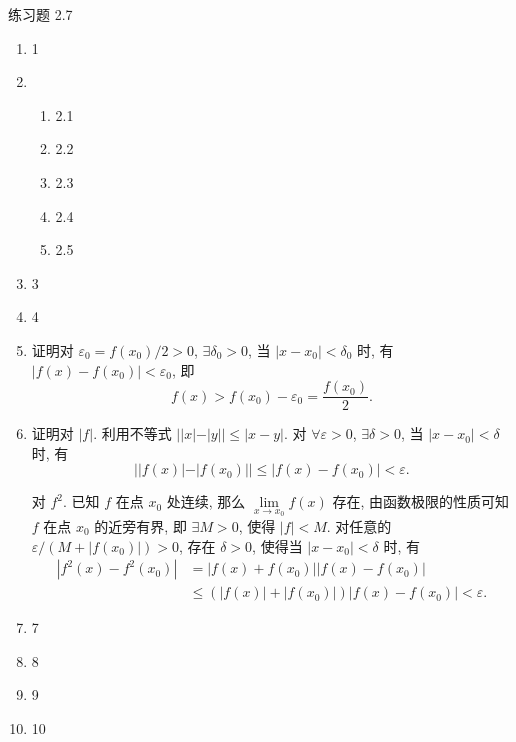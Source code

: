 \documentclass[a4paper, 12pt]{ctexart}
\begin{document}
\pagestyle{empty}

\begin{center}
    {\heiti 练习题 2.7}
\end{center}

\begin{enumerate}
    \item 1
    \item %
        \begin{enumerate}[(1)]
            \item 2.1
            \item 2.2
            \item 2.3
            \item 2.4
            \item 2.5
        \end{enumerate}
    \item 3
    \item 4
    \item %
        {\heiti 证明}\quad 对 $\varepsilon_0 = f(x_0)/2 > 0$, $\exists \delta_0 > 0$, 当 $|x - x_0| < \delta_0$ 时, 有 $|f(x) - f(x_0)| < \varepsilon_0$, 即
        \[
            f(x) > f(x_0) - \varepsilon_0 = \frac{f(x_0)}{2}.    
        \]
    \item %
        {\heiti 证明}\quad 对 $|f|$. 利用不等式 $||x| - |y|| \leqslant |x - y|$. 对 $\forall \varepsilon > 0$, $\exists \delta > 0$, 当 $|x - x_0| < \delta$ 时, 有
        \[
            ||f(x)| - |f(x_0)|| \leqslant |f(x) - f(x_0)| < \varepsilon.
        \]

        对 $f^2$. 已知 $f$ 在点 $x_0$ 处连续, 那么 $\lim\limits_{x\to x_0}f(x)$ 存在, 由函数极限的性质可知 $f$ 在点 $x_0$ 的近旁有界, 即 $\exists M > 0$, 使得 $|f| < M$.
        对任意的 $\varepsilon / (M + |f(x_0)|) > 0$, 存在 $\delta > 0$, 使得当 $|x - x_0| < \delta$ 时, 有
        \begin{align*}
            |f^2(x) - f^2(x_0)| &= |f(x) + f(x_0)||f(x) - f(x_0)| \\
                                &\leqslant (|f(x)| + |f(x_0)|)|f(x) - f(x_0)| < \varepsilon.   
        \end{align*} 
    \item 7
    \item 8
    \item 9
    \item 10
\end{enumerate}
\end{document}
